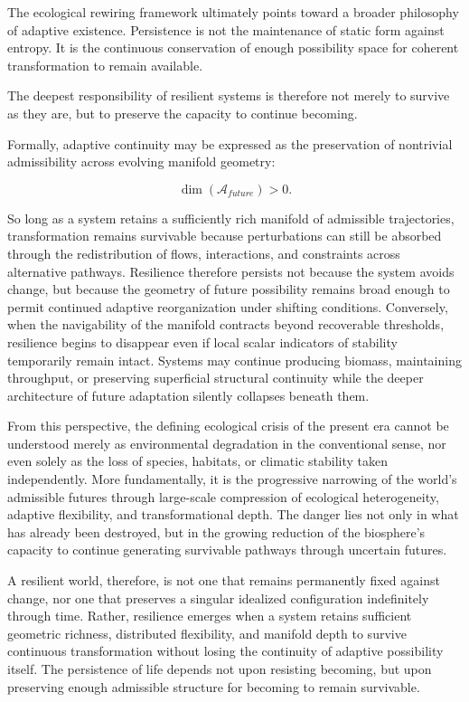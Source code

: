 \documentclass[11pt,a4paper]{article}
\newcommand{\Aspace}{\mathcal{A}}
\begin{document}
The ecological rewiring framework ultimately points toward a broader philosophy of adaptive existence. Persistence is not the maintenance of static form against entropy. It is the continuous conservation of enough possibility space for coherent transformation to remain available.

The deepest responsibility of resilient systems is therefore not merely to survive as they are, but to preserve the capacity to continue becoming.

Formally, adaptive continuity may be expressed as the preservation of nontrivial admissibility across evolving manifold geometry:

\[
\dim(\Aspace_{future}) > 0.
\]

So long as a system retains a sufficiently rich manifold of admissible trajectories, transformation remains survivable because perturbations can still be absorbed through the redistribution of flows, interactions, and constraints across alternative pathways. Resilience therefore persists not because the system avoids change, but because the geometry of future possibility remains broad enough to permit continued adaptive reorganization under shifting conditions. Conversely, when the navigability of the manifold contracts beyond recoverable thresholds, resilience begins to disappear even if local scalar indicators of stability temporarily remain intact. Systems may continue producing biomass, maintaining throughput, or preserving superficial structural continuity while the deeper architecture of future adaptation silently collapses beneath them.

From this perspective, the defining ecological crisis of the present era cannot be understood merely as environmental degradation in the conventional sense, nor even solely as the loss of species, habitats, or climatic stability taken independently. More fundamentally, it is the progressive narrowing of the world's admissible futures through large-scale compression of ecological heterogeneity, adaptive flexibility, and transformational depth. The danger lies not only in what has already been destroyed, but in the growing reduction of the biosphere's capacity to continue generating survivable pathways through uncertain futures.

A resilient world, therefore, is not one that remains permanently fixed against change, nor one that preserves a singular idealized configuration indefinitely through time. Rather, resilience emerges when a system retains sufficient geometric richness, distributed flexibility, and manifold depth to survive continuous transformation without losing the continuity of adaptive possibility itself. The persistence of life depends not upon resisting becoming, but upon preserving enough admissible structure for becoming to remain survivable.
\end{document}
